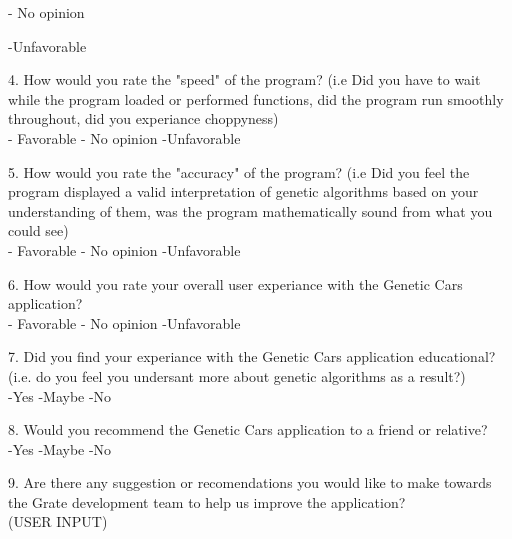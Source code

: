 \documentclass[12pt, titlepage]{article}
\begin{document}
- No opinion

-Unfavorable

4. How would you rate the "speed" of the program? (i.e Did you have to wait while the program loaded or performed functions, did the program run smoothly throughout, did you experiance choppyness)\\
- Favorable
- No opinion
-Unfavorable

5. How would you rate the "accuracy" of the program? (i.e Did you feel the program displayed a valid interpretation of genetic algorithms based on your understanding of them, was the program mathematically sound from what you could see)\\
- Favorable
- No opinion
-Unfavorable

6. How would you rate your overall user experiance with the Genetic Cars application?\\
- Favorable
- No opinion
-Unfavorable

7. Did you find your experiance with the Genetic Cars application educational? (i.e. do you feel you undersant more about genetic algorithms as a result?)\\
-Yes
-Maybe
-No

8. Would you recommend the Genetic Cars application to a friend or relative?\\
-Yes
-Maybe
-No

9. Are there any suggestion or recomendations you would like to make towards the Grate development team to help us improve the application?\\
(USER INPUT)
\end{document}

